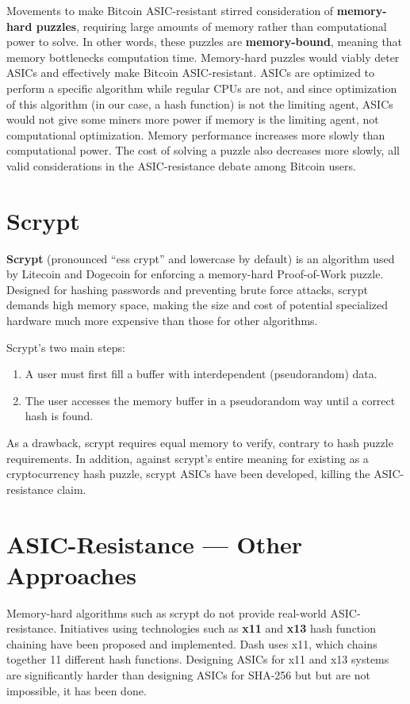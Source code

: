 \documentclass[full.tex]{subfiles}
\begin{document}
    Movements to make Bitcoin ASIC-resistant stirred consideration of \textbf{memory-hard puzzles}, requiring large amounts of memory rather than computational power to solve. In other words, these puzzles are \textbf{memory-bound}, meaning that memory bottlenecks computation time. Memory-hard puzzles would viably deter ASICs and effectively make Bitcoin ASIC-resistant. ASICs are optimized to perform a specific algorithm while regular CPUs are not, and since optimization of this algorithm (in our case, a hash function) is not the limiting agent, ASICs would not give some miners more power if memory is the limiting agent, not computational optimization. Memory performance increases more slowly than computational power. The cost of solving a puzzle also decreases more slowly, all valid considerations in the ASIC-resistance debate among Bitcoin users.
    
    \section*{Scrypt}
    
    \textbf{Scrypt} (pronounced ``ess crypt'' and lowercase by default) is an algorithm used by Litecoin and Dogecoin for enforcing a memory-hard Proof-of-Work puzzle. Designed for hashing passwords and preventing brute force attacks, scrypt demands high memory space, making the size and cost of potential specialized hardware much more expensive than those for other algorithms. 
    
    \noindent Scrypt's two main steps:
    \begin{enumerate}
        \item A user must first fill a buffer with interdependent (pseudorandom) data. 
        \item The user accesses the memory buffer in a pseudorandom way until a correct hash is found.
    \end{enumerate}
    As a drawback, scrypt requires equal memory to verify, contrary to hash puzzle requirements. In addition, against scrypt's entire meaning for existing as a cryptocurrency hash puzzle, scrypt ASICs have been developed, killing the ASIC-resistance claim.
    
    \section*{ASIC-Resistance --- Other Approaches}
    
    Memory-hard algorithms such as scrypt do not provide real-world ASIC-resistance. Initiatives using technologies such as \textbf{x11} and \textbf{x13} hash function chaining have been proposed and implemented. Dash uses x11, which chains together 11 different hash functions. Designing ASICs for x11 and x13 systems are significantly harder than designing ASICs for SHA-256 but but are not impossible, it has been done.
    
\end{document}
